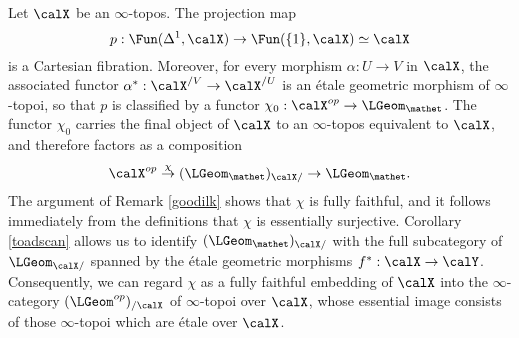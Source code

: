 \begin{remark}\label{postit}
Let $\calX$ be an $\infty$-topos. The projection map
$$p: \Fun( \Delta^1, \calX) \rightarrow \Fun( \{1\}, \calX) \simeq \calX$$
is a Cartesian fibration. Moreover, for every morphism $\alpha: U \rightarrow V$ in
$\calX$, the associated functor $\alpha^{\ast}: \calX^{/V} \rightarrow \calX^{/U}$ is an \'{e}tale 
geometric morphism of $\infty$-topoi, so that $p$ is classified by a functor
$\chi_0: \calX^{op} \rightarrow \LGeom_{\mathet}$. The functor $\chi_0$ carries the final object
of $\calX$ to an $\infty$-topos equivalent to $\calX$, and therefore factors as a composition
$$ \calX^{op} \stackrel{\chi}{\rightarrow} (\LGeom_{\mathet})_{\calX/} \rightarrow \LGeom_{\mathet}.$$
The argument of Remark \ref{goodilk} shows that $\chi$ is fully faithful, and
it follows immediately from the definitions that $\chi$ is essentially surjective.
Corollary \ref{toadscan} allows us to identify $(\LGeom_{\mathet})_{\calX/}$ with
the full subcategory of $\LGeom_{\calX/}$ spanned by the \'{e}tale geometric morphisms
$f^{\ast}: \calX \rightarrow \calY$. Consequently, we can regard $\chi$ as a fully faithful embedding
of $\calX$ into the $\infty$-category $(\LGeom^{op})_{/\calX}$ of $\infty$-topoi over $\calX$, whose essential image consists of those $\infty$-topoi which are \'{e}tale over $\calX$.
\end{remark}



